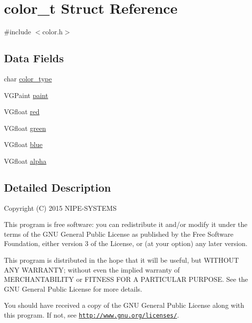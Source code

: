 \hypertarget{structcolor__t}{}\section{color\+\_\+t Struct Reference}
\label{structcolor__t}


{\ttfamily \#include $<$color.\+h$>$}

\subsection*{Data Fields}
\begin{DoxyCompactItemize}
\item 
char \hyperlink{structcolor__t_a318a5a811de8979c872107d7a87d2892}{color\+\_\+type}
\item 
V\+G\+Paint \hyperlink{structcolor__t_a17ecc773b13841683517fa109dd87984}{paint}
\item 
V\+Gfloat \hyperlink{structcolor__t_a10a626dea6494b5d765719fd8f9d4083}{red}
\item 
V\+Gfloat \hyperlink{structcolor__t_adf412886d6a8a6a475b7fefcffc57f12}{green}
\item 
V\+Gfloat \hyperlink{structcolor__t_ac8f064542ccd5e271f9c82f41a3a3c31}{blue}
\item 
V\+Gfloat \hyperlink{structcolor__t_a6b2539fa5dbd8434813368e7aa915292}{alpha}
\end{DoxyCompactItemize}


\subsection{Detailed Description}
Copyright (C) 2015 N\+I\+P\+E-\/\+S\+Y\+S\+T\+E\+M\+S

This program is free software\+: you can redistribute it and/or modify it under the terms of the G\+N\+U General Public License as published by the Free Software Foundation, either version 3 of the License, or (at your option) any later version.

This program is distributed in the hope that it will be useful, but W\+I\+T\+H\+O\+U\+T A\+N\+Y W\+A\+R\+R\+A\+N\+T\+Y; without even the implied warranty of M\+E\+R\+C\+H\+A\+N\+T\+A\+B\+I\+L\+I\+T\+Y or F\+I\+T\+N\+E\+S\+S F\+O\+R A P\+A\+R\+T\+I\+C\+U\+L\+A\+R P\+U\+R\+P\+O\+S\+E. See the G\+N\+U General Public License for more details.

You should have received a copy of the G\+N\+U General Public License along with this program. If not, see \href{http://www.gnu.org/licenses/}{\tt http\+://www.\+gnu.\+org/licenses/}. 

